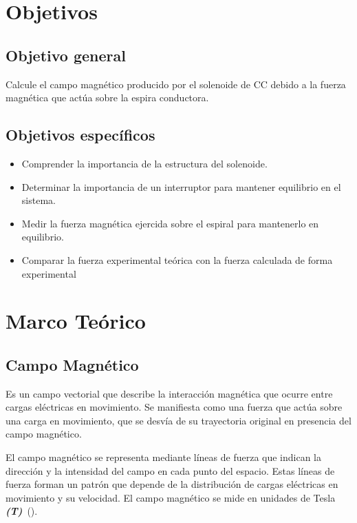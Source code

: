 \documentclass[twocolumn, 12pt]{article}
\begin{document}

\section{Objetivos}

\subsection{Objetivo general}

Calcule el campo magnético producido por el solenoide de CC
debido a la fuerza magnética que actúa sobre la espira
conductora.

\subsection{Objetivos específicos}

\begin{itemize}[label=$\triangleright$]
	\item Comprender la importancia de la estructura del solenoide.
	\item Determinar la importancia de un interruptor para mantener
	      equilibrio en el sistema.
	\item Medir la fuerza magnética ejercida sobre el espiral para
	      mantenerlo en equilibrio.
	\item Comparar la fuerza experimental teórica con la fuerza
	      calculada de forma experimental
\end{itemize}

\section{Marco Teórico}

\subsection*{Campo Magnético}

Es un campo vectorial que describe la interacción magnética
que ocurre entre cargas eléctricas en movimiento. Se
manifiesta como una fuerza que actúa sobre una carga en
movimiento, que se desvía de su trayectoria original en
presencia del campo magnético.

El campo magnético se representa mediante líneas de fuerza
que indican la dirección y la intensidad del campo en cada
punto del espacio. Estas líneas de fuerza forman un patrón
que depende de la distribución de cargas eléctricas en
movimiento y su velocidad. El campo magnético se mide en
unidades de Tesla
\textit{\textbf{(T)}}~(\cite{magnetic-fields-khanacademy}).
\end{document}
